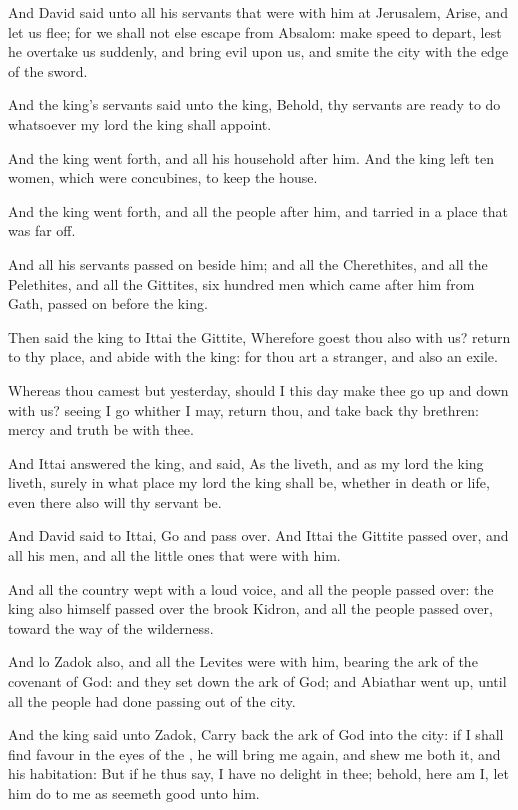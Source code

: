 \Verse And David said unto all his servants that were with him at Jerusalem, Arise, and let us flee; for we shall not else escape from Absalom: make speed to depart, lest he overtake us suddenly, and bring evil upon us, and smite the city with the edge of the sword.

\Verse And the king's servants said unto the king, Behold, thy servants are ready to do whatsoever my lord the king shall appoint.

\Verse And the king went forth, and all his household after him. And the king left ten women, which were concubines, to keep the house.

\Verse And the king went forth, and all the people after him, and tarried in a place that was far off.

\Verse And all his servants passed on beside him; and all the Cherethites, and all the Pelethites, and all the Gittites, six hundred men which came after him from Gath, passed on before the king.

\Verse Then said the king to Ittai the Gittite, Wherefore goest thou also with us? return to thy place, and abide with the king: for thou art a stranger, and also an exile.

\Verse Whereas thou camest but yesterday, should I this day make thee go up and down with us? seeing I go whither I may, return thou, and take back thy brethren: mercy and truth be with thee.

\Verse And Ittai answered the king, and said, As the \LORD liveth, and as my lord the king liveth, surely in what place my lord the king shall be, whether in death or life, even there also will thy servant be.

\Verse And David said to Ittai, Go and pass over. And Ittai the Gittite passed over, and all his men, and all the little ones that were with him.

\Verse And all the country wept with a loud voice, and all the people passed over: the king also himself passed over the brook Kidron, and all the people passed over, toward the way of the wilderness.

\Verse And lo Zadok also, and all the Levites were with him, bearing the ark of the covenant of God: and they set down the ark of God; and Abiathar went up, until all the people had done passing out of the city.

\Verse And the king said unto Zadok, Carry back the ark of God into the city: if I shall find favour in the eyes of the \LORD, he will bring me again, and shew me both it, and his habitation: \Verse But if he thus say, I have no delight in thee; behold, here am I, let him do to me as seemeth good unto him.

